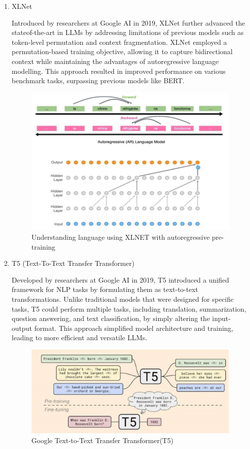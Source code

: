 \begin{enumerate}
\item XLNet

Introduced by researchers at Google AI in 2019, XLNet further advanced the stateof-the-art in LLMs by addressing limitations of previous models such as token-level permutation and context fragmentation. XLNet employed a permutation-based training objective, allowing it to capture bidirectional context while maintaining the advantages of autoregressive  language modelling. This approach resulted in improved performance on various benchmark tasks, surpassing previous models like BERT.

\begin{figure}[h]
    \centering
    \includegraphics[width=0.8\linewidth]{img/chap04/xlnet-arch.png}
    \caption{Understanding language using XLNET with autoregressive pre-training}
    \label{fig:xlnet-arch}
\end{figure}

\item T5 (Text-To-Text Transfer Transformer)

Developed by researchers at Google AI in 2019, T5 introduced a unified framework for NLP tasks by formulating them as text-to-text transformations. Unlike traditional models that were designed for specific tasks, T5 could perform multiple tasks, including translation, summarization, question answering, and text classification, by simply altering the input-output format. This approach simplified model architecture and training, leading to more efficient and versatile LLMs.
\begin{figure}[h]
    \centering
    \includegraphics[width=0.8\linewidth]{img/chap04/t5arch.png}
    \caption{Google Text-to-Text Transfer Transformer(T5)}
    \label{fig:t5-arch}
\end{figure}

\end{enumerate}



